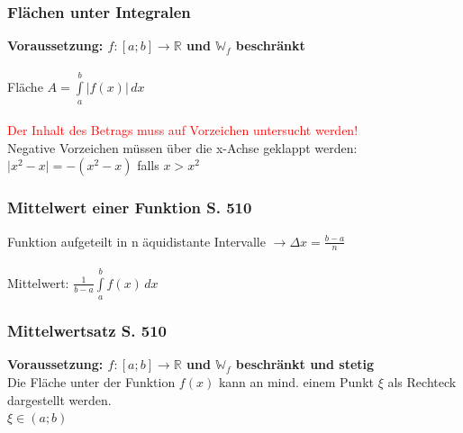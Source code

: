 			
		\subsubsection{Flächen unter Integralen}
		\textbf{Voraussetzung: $f: [a;b] \rightarrow \mathbb{R}$ und $\mathbb{W}_f$ beschränkt}\\
		\\
		Fläche $A = \int \limits_{a}^{b} \vert f(x) \vert \, dx $ \\
		\\
		\textcolor{red}{Der Inhalt des Betrags muss auf Vorzeichen untersucht werden!} \\
		Negative Vorzeichen müssen über die x-Achse geklappt werden: \\
		$\vert x^2 - x \vert = -(x^2 - x)$ falls $x > x^2$ 
		
		
		\subsubsection{Mittelwert einer Funktion S. 510}		
		Funktion aufgeteilt in n äquidistante Intervalle $\rightarrow \Delta x = \frac{b-a}{n}$ \\
		\\
		Mittelwert: \quad $\frac{1}{b-a} \int \limits_{a}^{b} f(x) \, dx$
		
		
		\subsubsection{Mittelwertsatz S. 510}
			\textbf{Voraussetzung: $f: [a;b] \rightarrow \mathbb{R}$ und $\mathbb{W}_f$ beschränkt und stetig} \\
		Die Fläche unter der Funktion $f(x)$ kann an mind. einem Punkt $\xi$ als Rechteck dargestellt werden. \\
		$\xi \in (a;b)$ \\
			

